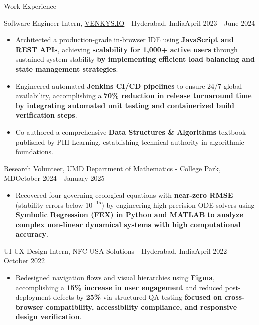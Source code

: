 \documentclass{resume} %
\begin{document}
\begin{rSection}{Work Experience}

\begin{rSubsection}
{Software Engineer Intern, \href{https://venkys.io}{VENKYS.IO} - Hyderabad, India}{April 2023 - June 2024}{}{}
\begin{itemize}[left=-1.5em, labelsep=.1cm, labelwidth=.2cm, itemsep=0.0em]
\item Architected a production-grade in-browser IDE using \textbf{JavaScript and REST APIs}, achieving \textbf{scalability for 1,000+ active users} through sustained system stability \textbf{by implementing efficient load balancing and state management strategies}.
\item Engineered automated \textbf{Jenkins CI/CD pipelines} to ensure 24/7 global availability, accomplishing a \textbf{70\% reduction in release turnaround time} \textbf{by integrating automated unit testing and containerized build verification steps}.
\item Co-authored a comprehensive \textbf{Data Structures \& Algorithms} textbook published by PHI Learning, establishing technical authority in algorithmic foundations.
\end{itemize}
\end{rSubsection}

\begin{rSubsection}
{Research Volunteer, UMD Department of Mathematics - College Park, MD}{October 2024 - January 2025}{}{}
\begin{itemize}[left=-1.5em, labelsep=.1cm, labelwidth=.2cm, itemsep=0.0em]
\item Recovered four governing ecological equations with \textbf{near-zero RMSE} (stability errors below $10^{-15}$) by engineering high-precision ODE solvers using \textbf{Symbolic Regression (FEX) in Python and MATLAB} \textbf{to analyze complex non-linear dynamical systems with high computational accuracy}.
\end{itemize}
\end{rSubsection}

\begin{rSubsection}
{UI UX Design Intern, NFC USA Solutions - Hyderabad, India}{April 2022 - October 2022}{}{}
\begin{itemize}[left=-1.5em, labelsep=.1cm, labelwidth=.2cm, itemsep=0.0em]
\item Redesigned navigation flows and visual hierarchies using \textbf{Figma}, accomplishing a \textbf{15\% increase in user engagement} and reduced post-deployment defects by \textbf{25\%} via structured QA testing \textbf{focused on cross-browser compatibility, accessibility compliance, and responsive design verification}.
\end{itemize}
\end{rSubsection}


\end{rSection}
\end{document}
